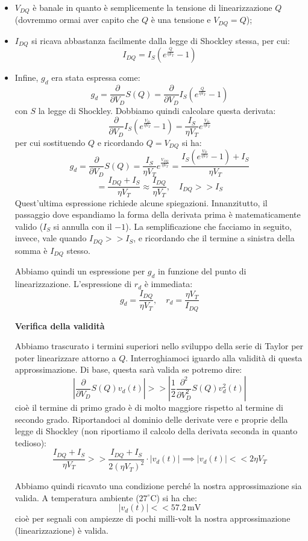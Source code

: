\documentclass[a4paper,11pt]{article}
\begin{document}
\begin{itemize}
	\item $V_{DQ}$ è banale in quanto è semplicemente la tensione di linearizzazione $Q$ (dovremmo ormai aver capito che $Q$ è una tensione e $V_{DQ} = Q$);
	\item $I_{DQ}$ si ricava abbastanza facilmente dalla legge di Shockley stessa, per cui:
$$
I_{DQ} = I_S \left( e^{\frac{Q}{\eta V_T}} - 1\right)
$$
	\item
Infine, $g_d$ era stata espressa come:
$$
g_d = \frac{\partial}{\partial V_D} S(Q) = \frac{\partial}{\partial V_D} I_S \left( e^{\frac{Q}{\eta V_T}} - 1\right)
$$
con $S$ la legge di Shockley. Dobbiamo quindi calcolare questa derivata:
$$
\frac{\partial}{\partial V_D} I_S \left( e^{\frac{V_D}{\eta V_T}} - 1\right) = 
\frac{I_S}{\eta V_T} e^{\frac{V_D}{\eta V_T}}
$$
per cui sostituendo $Q$ e ricordando $Q = V_{DQ}$ si ha:
$$
g_d = \frac{\partial}{\partial V_D} S(Q)=
\frac{I_S}{\eta V_T} e^{\frac{V_{DQ}}{\eta V_T}} = \frac{I_S \left( e^{\frac{V_D}{\eta V_T}} - 1 \right) + I_S }{\eta V_T} 
$$
$$
= \frac{I_{DQ} + I_S }{\eta V_T} \approx \frac{I_{DQ}}{\eta V_T}, \quad I_{DQ} >> I_S
$$
Quest'ultima espressione richiede alcune spiegazioni. Innanzitutto, il passaggio dove espandiamo la forma della derivata prima è matematicamente valido ($I_S$ si annulla con il $-1$). La semplificazione che facciamo in seguito, invece, vale quando $I_{DQ} >> I_S$, e ricordando che il termine a sinistra della somma è $I_{DQ}$ stesso.

Abbiamo quindi un espressione per $g_d$ in funzione del punto di linearizzazione. L'espressione di $r_d$ è immediata:
$$
g_d = \frac{I_{DQ}}{\eta V_T}, \quad r_d = \frac{\eta V_T}{I_{DQ}}
$$

\par\smallskip

\noindent
\textbf{\textsf{Verifica della validità}}

\noindent
Abbiamo trascurato i termini superiori nello sviluppo della serie di Taylor per poter linearizzare attorno a $Q$. Interroghiamoci iguardo alla validità di questa approssimazione. 
Di base, questa sarà valida se potremo dire:
$$
\left| \frac{\partial}{\partial V_D} S(Q) v_d(t) \right| >>
\left| \frac{1}{2} \frac{\partial^2}{\partial V_D^2} S(Q) v_d^2(t) \right|
$$
cioè il termine di primo grado è di molto maggiore rispetto al termine di secondo grado. Riportandoci al dominio delle derivate vere e proprie della legge di Shockley (non riportiamo il calcolo della derivata seconda in quanto tedioso):
$$
\frac{I_{DQ} + I_S}{\eta V_T} >> \frac{I_{DQ} + I_S}{2(\eta V_T)^2} \cdot |v_d(t)| \implies |v_d(t)| << 2 \eta V_T
$$

Abbiamo quindi ricavato una condizione perché la nostra approssimazione sia valida. A temperatura ambiente ($27^\circ \mathrm{C}$) si ha che:
$$
|v_d(t)| << 57.2 \,\mathrm{mV}
$$
cioè per segnali con ampiezze di pochi milli-volt la nostra approssimazione (linearizzazione) è valida.

\end{itemize}
\end{document}
